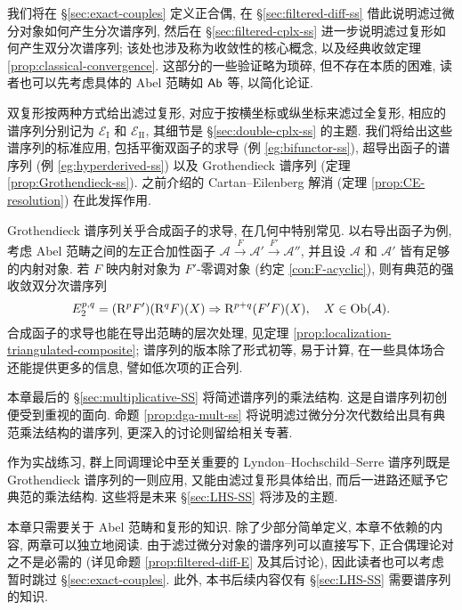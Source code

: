 我们将在 \S\ref{sec:exact-couples} 定义正合偶, 在 \S\ref{sec:filtered-diff-ss} 借此说明滤过微分对象如何产生分次谱序列, 然后在 \S\ref{sec:filtered-cplx-ss} 进一步说明滤过复形如何产生双分次谱序列; 该处也涉及称为收敛性的核心概念, 以及经典收敛定理 \ref{prop:classical-convergence}. 这部分的一些验证略为琐碎, 但不存在本质的困难, 读者也可以先考虑具体的 Abel 范畴如 $\mathsf{Ab}$ 等, 以简化论证.

双复形按两种方式给出滤过复形, 对应于按横坐标或纵坐标来滤过全复形, 相应的谱序列分别记为 $\mathscr{E}_{\mathrm{I}}$ 和 $\mathscr{E}_{\mathrm{II}}$, 其细节是 \S\ref{sec:double-cplx-ss} 的主题. 我们将给出这些谱序列的标准应用, 包括平衡双函子的求导 (例 \ref{eg:bifunctor-ss}), 超导出函子的谱序列 (例 \ref{eg:hyperderived-ss}) 以及 Grothendieck 谱序列 (定理 \ref{prop:Grothendieck-ss}). 之前介绍的 Cartan--Eilenberg 解消 (定理 \ref{prop:CE-resolution}) 在此发挥作用.

Grothendieck 谱序列关乎合成函子的求导, 在几何中特别常见. 以右导出函子为例, 考虑 Abel 范畴之间的左正合加性函子 $\mathcal{A} \xrightarrow{F} \mathcal{A}' \xrightarrow{F'} \mathcal{A}''$, 并且设 $\mathcal{A}$ 和 $\mathcal{A}'$ 皆有足够的内射对象. 若 $F$ 映内射对象为 $F'$-零调对象 (约定 \ref{con:F-acyclic}), 则有典范的强收敛双分次谱序列
\[ E_2^{p, q} = (\mathrm{R}^p F') (\mathrm{R}^q F)(X) \Rightarrow \mathrm{R}^{p+q}(F' F)(X), \quad X \in \operatorname{Ob}(\mathcal{A}). \]
合成函子的求导也能在导出范畴的层次处理, 见定理 \ref{prop:localization-triangulated-composite}; 谱序列的版本除了形式初等, 易于计算, 在一些具体场合还能提供更多的信息, 譬如低次项的正合列.

本章最后的 \S\ref{sec:multiplicative-SS} 将简述谱序列的乘法结构. 这是自谱序列初创便受到重视的面向. 命题 \ref{prop:dga-mult-ss} 将说明滤过微分分次代数给出具有典范乘法结构的谱序列, 更深入的讨论则留给相关专著.

作为实战练习, 群上同调理论中至关重要的 Lyndon--Hochschild--Serre 谱序列既是 Grothendieck 谱序列的一则应用, 又能由滤过复形具体给出, 而后一进路还赋予它典范的乘法结构. 这些将是未来 \S\ref{sec:LHS-SS} 将涉及的主题.

\begin{wenxintishi}
	本章只需要关于 Abel 范畴和复形的知识. 除了少部分简单定义, 本章不依赖的内容, 两章可以独立地阅读. 由于滤过微分对象的谱序列可以直接写下, 正合偶理论对之不是必需的 (详见命题 \ref{prop:filtered-diff-E} 及其后讨论), 因此读者也可以考虑暂时跳过 \S\ref{sec:exact-couples}. 此外, 本书后续内容仅有 \S\ref{sec:LHS-SS} 需要谱序列的知识.
\end{wenxintishi}

